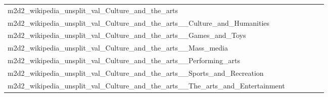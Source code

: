 \documentclass[dvipsnames]{article}
\begin{document}
\begin{appendix}
{\begin{longtable}{m{6cm}m{1.7cm}m{1.7cm}m{1.7cm}m{1.7cm}m{1.7cm}}
	m2d2\_wikipedia\_unsplit\_val\_Culture\_and\_the\_arts  & \colorbox[HTML]{fefee2}{\makebox[\mywidth][c]{12.30}} & \colorbox[HTML]{eef8b2}{\makebox[\mywidth][c]{11.90}} & \colorbox[HTML]{ffffe5}{\makebox[\mywidth][c]{12.82}} & \colorbox[HTML]{cae99c}{\makebox[\mywidth][c]{11.78}} & \colorbox[HTML]{77c578}{\makebox[\mywidth][c]{11.66}}\\
	m2d2\_wikipedia\_unsplit\_val\_Culture\_and\_the\_arts\_\_Culture\_and\_Humanities  & \colorbox[HTML]{fdfedf}{\makebox[\mywidth][c]{12.13}} & \colorbox[HTML]{edf8b2}{\makebox[\mywidth][c]{11.74}} & \colorbox[HTML]{ffffe5}{\makebox[\mywidth][c]{12.82}} & \colorbox[HTML]{d0ec9e}{\makebox[\mywidth][c]{11.63}} & \colorbox[HTML]{77c578}{\makebox[\mywidth][c]{11.48}}\\
	m2d2\_wikipedia\_unsplit\_val\_Culture\_and\_the\_arts\_\_Games\_and\_Toys  & \colorbox[HTML]{f9fdc9}{\makebox[\mywidth][c]{14.06}} & \colorbox[HTML]{e8f6ae}{\makebox[\mywidth][c]{13.86}} & \colorbox[HTML]{ffffe5}{\makebox[\mywidth][c]{15.17}} & \colorbox[HTML]{daf0a4}{\makebox[\mywidth][c]{13.79}} & \colorbox[HTML]{77c578}{\makebox[\mywidth][c]{13.57}}\\
	m2d2\_wikipedia\_unsplit\_val\_Culture\_and\_the\_arts\_\_Mass\_media  & \colorbox[HTML]{fefee0}{\makebox[\mywidth][c]{12.16}} & \colorbox[HTML]{eff8b3}{\makebox[\mywidth][c]{11.80}} & \colorbox[HTML]{ffffe5}{\makebox[\mywidth][c]{12.74}} & \colorbox[HTML]{eef8b2}{\makebox[\mywidth][c]{11.79}} & \colorbox[HTML]{77c578}{\makebox[\mywidth][c]{11.55}}\\
	m2d2\_wikipedia\_unsplit\_val\_Culture\_and\_the\_arts\_\_Performing\_arts  & \colorbox[HTML]{ffffe5}{\makebox[\mywidth][c]{11.75}} & \colorbox[HTML]{f2fab5}{\makebox[\mywidth][c]{11.25}} & \colorbox[HTML]{ffffe5}{\makebox[\mywidth][c]{12.03}} & \colorbox[HTML]{daf0a4}{\makebox[\mywidth][c]{11.17}} & \colorbox[HTML]{77c578}{\makebox[\mywidth][c]{11.03}}\\
	m2d2\_wikipedia\_unsplit\_val\_Culture\_and\_the\_arts\_\_Sports\_and\_Recreation  & \colorbox[HTML]{fefee3}{\makebox[\mywidth][c]{10.01}} & \colorbox[HTML]{d1ec9f}{\makebox[\mywidth][c]{9.63}} & \colorbox[HTML]{ffffe5}{\makebox[\mywidth][c]{10.36}} & \colorbox[HTML]{a5d98b}{\makebox[\mywidth][c]{9.58}} & \colorbox[HTML]{77c578}{\makebox[\mywidth][c]{9.54}}\\
	m2d2\_wikipedia\_unsplit\_val\_Culture\_and\_the\_arts\_\_The\_arts\_and\_Entertainment  & \colorbox[HTML]{fdfedb}{\makebox[\mywidth][c]{12.13}} & \colorbox[HTML]{f1f9b4}{\makebox[\mywidth][c]{11.85}} & \colorbox[HTML]{ffffe5}{\makebox[\mywidth][c]{12.83}} & \colorbox[HTML]{d5eea1}{\makebox[\mywidth][c]{11.73}} & \colorbox[HTML]{77c578}{\makebox[\mywidth][c]{11.58}}\\

\end{longtable}}
\end{appendix}
\end{document}
